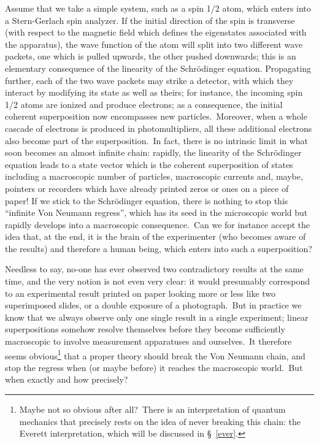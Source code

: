 \documentclass[12pt,onecolumn]{article}%
\begin{document}
Assume that we take a simple system, such as a spin 1/2 atom, which enters
into a Stern-Gerlach spin analyzer. If the initial direction of the spin is
transverse (with respect to the magnetic field which defines the eigenstates
associated with the apparatus), the wave function of the atom will split into
two different wave packets, one which is pulled upwards, the other pushed
downwards; this is an elementary consequence of the linearity of the
Schr\"{o}dinger equation. Propagating further, each of the two wave packets
may strike a detector, with which they interact by modifying its state as well
as theirs; for instance, the incoming spin 1/2 atoms are ionized and produce
electrons; as a consequence, the initial coherent superposition now
encompasses new particles.\ Moreover, when a whole cascade of electrons is
produced in photomultipliers, all these additional electrons also become part
of the superposition.\ In fact, there is no intrinsic limit in what soon
becomes an almost infinite chain: rapidly, the linearity of the
Schr\"{o}dinger equation leads to a state vector which is the coherent
superposition of states including a macroscopic number of particles,
macroscopic currents and, maybe, pointers or recorders which have already
printed zeros or ones on a piece of paper! If we stick to the Schr\"{o}dinger
equation, there is nothing to stop this ``infinite Von Neumann regress'',
which has its seed in the microscopic world but rapidly develops into a
macroscopic consequence.\ Can we for instance accept the idea that, at the
end, it is the brain of the experimenter (who becomes aware of the results)
and therefore a human being, which enters into such a superposition?

Needless to say, no-one has ever observed two contradictory results at the
same time, and the very notion is not even very clear: it would presumably
correspond to an experimental result printed on paper looking more or less
like two superimposed slides, or a double exposure of a photograph.\ But in
practice we know that we always observe only one single result in a single
experiment; linear superpositions somehow resolve themselves before they
become sufficiently macroscopic to involve measurement apparatuses and
ourselves.\ It therefore seems obvious\footnote{Maybe not so obvious after
all?\ There is an interpretation of quantum mechanics that precisely rests on
the idea of never breaking this chain: the Everett interpretation, which will
be discussed in \S \ \ref{ever}.} that a proper theory should break the Von
Neumann chain, and stop the regress when (or maybe before) it reaches the
macroscopic world.\ But when exactly and how precisely?
\end{document}
